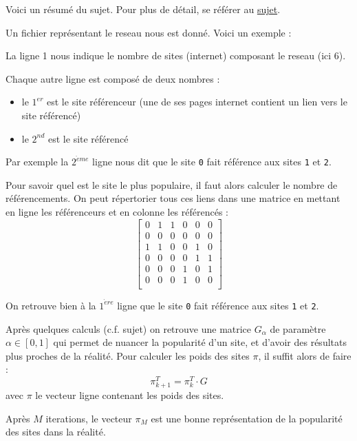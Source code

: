 Voici un résumé du sujet. Pour plus de détail, se référer au \href{https://raw.githubusercontent.com/seba1204/cours/master/n7/s5/pim/tp/projet/doc/sujet.pdf}{sujet}.

Un fichier représentant le reseau nous est donné. Voici un exemple :



La ligne 1 nous indique le nombre de sites (internet) composant le reseau (ici 6).

Chaque autre ligne est composé de deux nombres : 
\begin{itemize}
   \item le $1^{er}$ est le site référenceur (une de ses pages internet contient un lien vers le site référencé)
   \item le $2^{nd}$ est le site référencé
\end{itemize}

Par exemple la $2^{\grave{e}me}$ ligne nous dit que le site \lstinline{0} fait référence aux sites \lstinline{1} et \lstinline{2}.

Pour savoir quel est le site le plus populaire, il faut alors calculer le nombre de référencements.
On peut répertorier tous ces liens dans une matrice en mettant en ligne les référenceurs et en colonne les référencés :
\[
   \begin{bmatrix}
      0 & 1 & 1 & 0 & 0 & 0  \\
      0 & 0 & 0 & 0 & 0 & 0  \\
      1 & 1 & 0 & 0 & 1 & 0  \\
      0 & 0 & 0 & 0 & 1 & 1  \\
      0 & 0 & 0 & 1 & 0 & 1  \\
      0 & 0 & 0 & 1 & 0 & 0  \\
   \end{bmatrix}
\]

On retrouve bien à la $1^{\grave{e}re}$ ligne que le site \lstinline{0} fait référence aux sites \lstinline{1} et \lstinline{2}.

Après quelques calculs (c.f. sujet) on retrouve une matrice $G_{\alpha}$ de paramètre $\alpha \in [0,1]$ qui permet de nuancer la popularité d'un site, et d'avoir des résultats plus proches de la réalité.
Pour calculer les poids des sites $\pi$, il suffit alors de faire : 
\[
   \pi^{T}_{k+1} = \pi^{T}_{k} \cdot G
\]
avec $\pi$ le vecteur ligne contenant les poids des sites.

Après $M$ iterations, le vecteur $\pi_{M}$ est une bonne représentation de la popularité des sites dans la réalité.